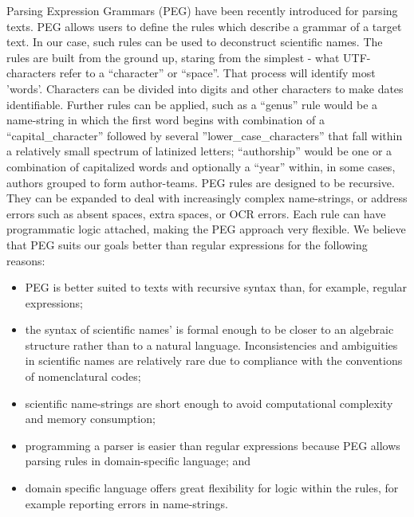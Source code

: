 \documentclass{bmcart}
\begin{document}
Parsing Expression Grammars (PEG) \cite{Ford2004} have been recently introduced for parsing texts. PEG allows users to define the rules which describe a grammar
of a target text. In our case, such rules can be used to deconstruct scientific names.
The rules are built from the ground up, staring from the simplest - what UTF-characters refer to a ``character'' or ``space''.  That process will identify most 'words'.  Characters can be divided into digits and other characters to make dates identifiable. Further rules can be applied, such as a ``genus'' rule would be a name-string in which the first word begins with combination of a
``capital\_character'' followed by several ''lower\_case\_characters'' that fall within a relatively small spectrum of latinized letters;  
``authorship'' would be one or a combination of capitalized words and optionally a ``year'' within, in some cases, authors grouped to form author-teams. PEG rules are designed to be recursive. They can be expanded to deal with increasingly complex name-strings, or address  errors such as absent spaces, extra spaces, or OCR errors. Each rule can have programmatic logic attached, making the PEG approach very flexible. We believe that PEG suits our goals
better than regular expressions for the following reasons:

\begin{itemize}

  \item PEG is better suited to texts with recursive syntax than, for example, regular expressions;

  \item the syntax of scientific names' is formal enough to be closer to an algebraic
    structure rather than to a natural language. Inconsistencies and
    ambiguities in scientific names are relatively rare due to compliance with the conventions of nomenclatural codes;

  \item scientific name-strings are short enough to avoid
    computational complexity and memory consumption;

  \item programming a parser is easier than regular expressions because
    PEG allows parsing rules in domain-specific language; and

  \item domain specific language offers great flexibility for logic within
    the rules, for example reporting errors in name-strings.

\end{itemize}
\end{document}
